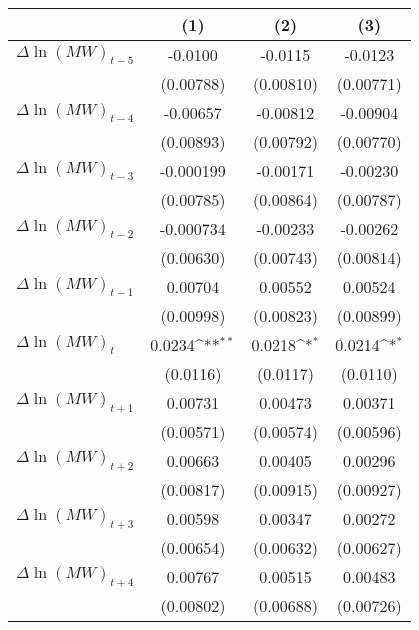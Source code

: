 {
\def\sym#1{\ifmmode^{#1}\else\(^{#1}\)\fi}
\begin{tabular}{l*{3}{c}}
\hline\hline
          &\multicolumn{1}{c}{(1)}         &\multicolumn{1}{c}{(2)}         &\multicolumn{1}{c}{(3)}         \\
\hline
$\Delta \ln(MW)_{t-5}$&  -0.0100         &  -0.0115         &  -0.0123         \\
          &(0.00788)         &(0.00810)         &(0.00771)         \\
[1em]
$\Delta \ln(MW)_{t-4}$& -0.00657         & -0.00812         & -0.00904         \\
          &(0.00893)         &(0.00792)         &(0.00770)         \\
[1em]
$\Delta \ln(MW)_{t-3}$&-0.000199         & -0.00171         & -0.00230         \\
          &(0.00785)         &(0.00864)         &(0.00787)         \\
[1em]
$\Delta \ln(MW)_{t-2}$&-0.000734         & -0.00233         & -0.00262         \\
          &(0.00630)         &(0.00743)         &(0.00814)         \\
[1em]
$\Delta \ln(MW)_{t-1}$&  0.00704         &  0.00552         &  0.00524         \\
          &(0.00998)         &(0.00823)         &(0.00899)         \\
[1em]
$\Delta \ln(MW)_{t}$&   0.0234\sym{**} &   0.0218\sym{*}  &   0.0214\sym{*}  \\
          & (0.0116)         & (0.0117)         & (0.0110)         \\
[1em]
$\Delta \ln(MW)_{t+1}$&  0.00731         &  0.00473         &  0.00371         \\
          &(0.00571)         &(0.00574)         &(0.00596)         \\
[1em]
$\Delta \ln(MW)_{t+2}$&  0.00663         &  0.00405         &  0.00296         \\
          &(0.00817)         &(0.00915)         &(0.00927)         \\
[1em]
$\Delta \ln(MW)_{t+3}$&  0.00598         &  0.00347         &  0.00272         \\
          &(0.00654)         &(0.00632)         &(0.00627)         \\
[1em]
$\Delta \ln(MW)_{t+4}$&  0.00767         &  0.00515         &  0.00483         \\
          &(0.00802)         &(0.00688)         &(0.00726)         \\

\end{tabular}}
